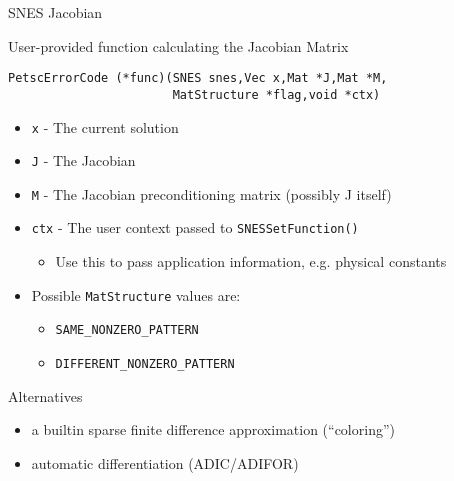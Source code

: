 \begin{frame}[fragile]{SNES Jacobian}

\begin{block}{User-provided function calculating the Jacobian Matrix}
\begin{lstlisting}
PetscErrorCode (*func)(SNES snes,Vec x,Mat *J,Mat *M,
                       MatStructure *flag,void *ctx)
\end{lstlisting}

\begin{itemize}
  \item \lstinline|x| - The current solution
  \item \lstinline|J| - The Jacobian
  \item \lstinline|M| -  The Jacobian preconditioning matrix (possibly J itself)
  \item \lstinline|ctx| - The user context passed to \lstinline|SNESSetFunction()|
  \begin{itemize}
    \item Use this to pass application information, e.g. physical constants
  \end{itemize}

  \item Possible \lstinline|MatStructure| values are:
  \begin{itemize}
    \item \lstinline|SAME_NONZERO_PATTERN|
    \item \lstinline|DIFFERENT_NONZERO_PATTERN|
  \end{itemize}
\end{itemize}
\end{block}

\begin{block}{Alternatives}
\begin{itemize}
  \item a builtin sparse finite difference approximation (``coloring'')
  \item automatic differentiation (ADIC/ADIFOR)
\end{itemize}
\end{block}

\end{frame}
